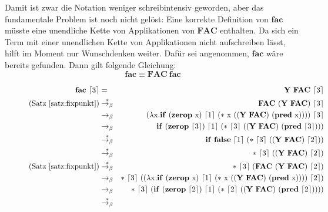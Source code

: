 Damit ist zwar die Notation weniger schreibintensiv geworden,
aber das fundamentale Problem ist noch nicht gelöst: Eine korrekte
Definition von $\mathbf{fac}$ müsste eine unendliche
Kette von Applikationen von $\mathbf{FAC}$ enthalten.
Da sich ein Term mit einer unendlichen Kette von Applikationen nicht aufschreiben lässt, hilft im Moment nur Wunschdenken weiter.
Dafür sei angenommen, $\mathbf{fac}$ wäre bereits gefunden.  Dann gilt folgende
Gleichung:
%
\begin{displaymath}
  \mathbf{fac} \equiv \mathbf{FAC}~\mathbf{fac}
\end{displaymath}
%
\begin{figure}[!tb]
  \begin{center}
    \scriptsize
    \begin{eqnarray*}
    \mathbf{fac}~\lceil 3\rceil &=& \mathbf{Y}~\mathbf{FAC}~\lceil 3\rceil\\
    \text{(Satz~\ref{satz:fixpunkt})} &\overset{\ast}{\rightarrow_{\beta}}&
    \mathbf{FAC}~(\mathbf{Y}~\mathbf{FAC})~\lceil 3\rceil\\
    &\rightarrow_{\beta}&
    (\lambda \lrm x.\mathbf{if}~(\mathbf{zerop}~\lrm x)~\lceil 1\rceil~(\ast~\lrm x~((\mathbf{Y}~\mathbf{FAC})~(\mathbf{pred}~\lrm x))))~\lceil 3\rceil\\
    &\rightarrow_{\beta}&
    \mathbf{if}~(\mathbf{zerop}~ \lceil 3\rceil)~\lceil 1\rceil~(\ast~\lceil 3\rceil~((\mathbf{Y}~\mathbf{FAC})~(\mathbf{pred}~\lceil 3\rceil)))
    \\
    &\overset{\ast}{\rightarrow_{\beta}}&
    \mathbf{if}~\mathbf{false}~\lceil 1\rceil~(\ast~\lceil 3\rceil~((\mathbf{Y}~\mathbf{FAC})~\lceil 2\rceil))\\
    &\overset{\ast}{\rightarrow_{\beta}}&
    \ast~\lceil 3\rceil~((\mathbf{Y}~\mathbf{FAC})~\lceil 2\rceil)\\
    \text{(Satz~\ref{satz:fixpunkt})} &\overset{\ast}{\rightarrow_{\beta}}&
    \ast~\lceil 3\rceil~(\mathbf{FAC}~(\mathbf{Y}~\mathbf{FAC})~\lceil 2\rceil)\\
    &\rightarrow_{\beta}&
    \ast~\lceil 3\rceil~((\lambda
    \lrm x.\mathbf{if}~(\mathbf{zerop}~\lrm x)~\lceil 1\rceil~(\ast~\lrm x~((\mathbf{Y}~\mathbf{FAC})~(\mathbf{pred}~\lrm x))))~\lceil 2\rceil)\\
    &\rightarrow_{\beta}&
    \ast~\lceil 3\rceil~(\mathbf{if}~(\mathbf{zerop}~ \lceil 2\rceil)~\lceil 1\rceil~(\ast~\lceil 2\rceil~((\mathbf{Y}~\mathbf{FAC})~(\mathbf{pred}~\lceil 2\rceil))))\\
    &\overset{\ast}{\rightarrow_{\beta}}&

\end{eqnarray*}
\end{center}
\end{figure}
